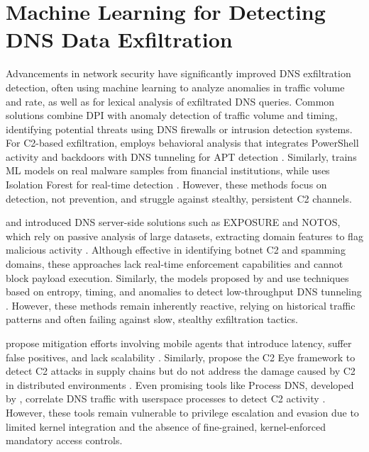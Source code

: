 \documentclass [11pt, proquest] {uwthesis}[2020/02/24]
\begin{document}
\section{Machine Learning for Detecting DNS Data Exfiltration}
Advancements in network security have significantly improved DNS exfiltration detection, often using machine learning to analyze anomalies in traffic volume and rate, as well as for lexical analysis of exfiltrated DNS queries. Common solutions combine DPI with anomaly detection of traffic volume and timing, identifying potential threats using DNS firewalls or intrusion detection systems. For C2-based exfiltration, \citeauthor{apt-process} employs behavioral analysis that integrates PowerShell activity and backdoors with DNS tunneling for APT detection \cite{apt-process}. Similarly, \citeauthor{Das} trains ML models on real malware samples from financial institutions, while \citeauthor{8717806d} uses Isolation Forest for real-time detection \cite{Das,8717806d}. However, these methods focus on detection, not prevention, and struggle against stealthy, persistent C2 channels.

\citeauthor{bilge2011exposure} and \citeauthor{antonakakis2010building} introduced DNS server-side solutions such as EXPOSURE and NOTOS, which rely on passive analysis of large datasets, extracting domain features to flag malicious activity \cite{bilge2011exposure, antonakakis2010building}. Although effective in identifying botnet C2 and spamming domains, these approaches lack real-time enforcement capabilities and cannot block payload execution. Similarly, the models proposed by \citeauthor{DBLP:journals/corr/abs-1709-08395} and \citeauthor{10.1145/3230833.3233278} use techniques based on entropy, timing, and anomalies to detect low-throughput DNS tunneling \cite{DBLP:journals/corr/abs-1709-08395, 10.1145/3230833.3233278}. However, these methods remain inherently reactive, relying on historical traffic patterns and often failing against slow, stealthy exfiltration tactics.

\citeauthor{9486400} propose mitigation efforts involving mobile agents that introduce latency, suffer false positives, and lack scalability \cite{9486400}. Similarly, \citeauthor{haider2024c2} propose the C2 Eye framework to detect C2 attacks in supply chains but do not address the damage caused by C2 in distributed environments \cite{haider2024c2}. Even promising tools like Process DNS, developed by \citeauthor{sivakorn2019countering}, correlate DNS traffic with userspace processes to detect C2 activity \cite{sivakorn2019countering}. However, these tools remain vulnerable to privilege escalation and evasion due to limited kernel integration and the absence of fine-grained, kernel-enforced mandatory access controls.
\end{document}
